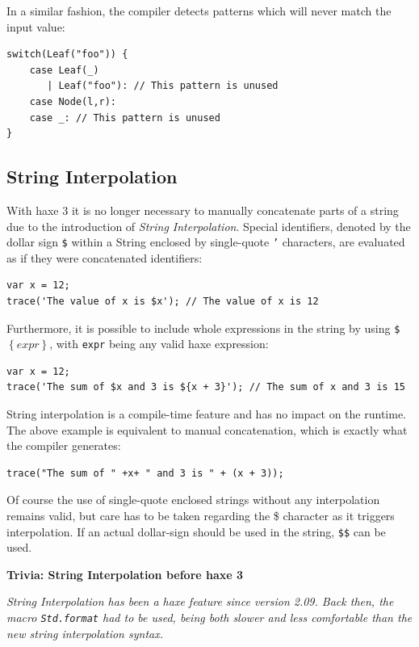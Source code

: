 \documentclass{article}
\newcommand{\expr}[1]{\texttt{#1}}
\newenvironment{myshaded}
  {\def\FrameCommand{\fboxsep=\topsep\colorbox{bgcolor}}%
  \MakeFramed {\advance\hsize-\width \FrameRestore}}%
 {\endMakeFramed}
\newcommand{\trivia}[2]
	{\begin{myshaded}\noindent\textbf{Trivia: #1}\par\nobreak\noindent\ignorespaces\textit{#2}\end{myshaded}}
\begin{document}
In a similar fashion, the compiler detects patterns which will never match the input value:

\begin{lstlisting}
switch(Leaf("foo")) {
    case Leaf(_)
       | Leaf("foo"): // This pattern is unused
    case Node(l,r):
    case _: // This pattern is unused
}
\end{lstlisting}



\subsection{String Interpolation}

With haxe 3 it is no longer necessary to manually concatenate parts of a string due to the introduction of \emph{String Interpolation}. Special identifiers, denoted by the dollar sign \expr{\$} within a String enclosed by single-quote \expr{'} characters, are evaluated as if they were concatenated identifiers:

\begin{lstlisting}
var x = 12;
trace('The value of x is $x'); // The value of x is 12
\end{lstlisting}
Furthermore, it is possible to include whole expressions in the string by using \expr{\$$\left\{expr\right\}$}, with \expr{expr} being any valid haxe expression:

\begin{lstlisting}
var x = 12;
trace('The sum of $x and 3 is ${x + 3}'); // The sum of x and 3 is 15
\end{lstlisting} 
String interpolation is a compile-time feature and has no impact on the runtime. The above example is equivalent to manual concatenation, which is exactly what the compiler generates:

\begin{lstlisting}
trace("The sum of " +x+ " and 3 is " + (x + 3));
\end{lstlisting}
Of course the use of single-quote enclosed strings without any interpolation remains valid, but care has to be taken regarding the \$ character as it triggers interpolation. If an actual dollar-sign should be used in the string, \expr{\$\$} can be used.

\trivia{String Interpolation before haxe 3}{String Interpolation has been a haxe feature since version 2.09. Back then, the macro \expr{Std.format} had to be used, being both slower and less comfortable than the new string interpolation syntax.}
\end{document}

